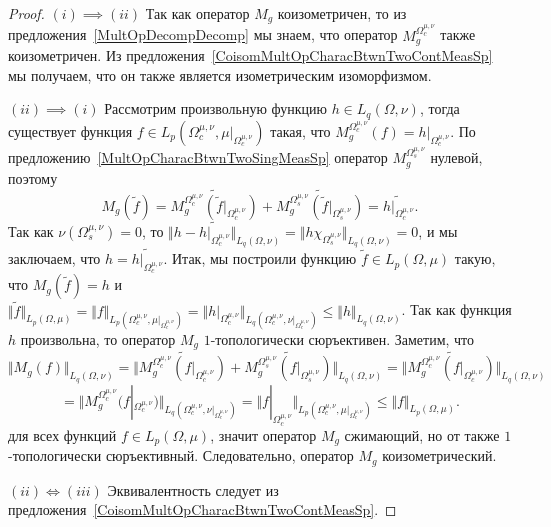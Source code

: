 \begin{proof} $(i) \implies (ii)$ Так как оператор $M_g$ коизометричен, то из
предложения~\ref{MultOpDecompDecomp} мы знаем, что оператор
$M_g^{\Omega_c^{\mu,\nu}}$ также коизометричен. Из
предложения~\ref{CoisomMultOpCharacBtwnTwoContMeasSp} мы получаем, что он также
является изометрическим изоморфизмом. 

$(ii) \implies (i)$ Рассмотрим произвольную функцию $h\in L_q(\Omega,\nu)$,
тогда существует функция $f\in
L_p(\Omega_c^{\mu,\nu},\mu|_{\Omega_c^{\mu,\nu}})$ такая, что
$M_g^{\Omega_c^{\mu,\nu}}(f)=h|_{\Omega_c^{\mu,\nu}}$. По
предложению~\ref{MultOpCharacBtwnTwoSingMeasSp} оператор
$M_g^{\Omega_s^{\mu,\nu}}$ нулевой, поэтому
$$
M_g(\widetilde{f})
=\widetilde{M_g^{\Omega_c^{\mu,\nu}}(\widetilde{f}|_{\Omega_c^{\mu,\nu}})}
+\widetilde{M_g^{\Omega_s^{\mu,\nu}}(\widetilde{f}|_{\Omega_s^{\mu,\nu}})}
=\widetilde{h|_{\Omega_c^{\mu,\nu}}}.
$$
Так как $\nu(\Omega_s^{\mu,\nu})=0$, то 
$\Vert h-\widetilde{h|_{\Omega_c^{\mu,\nu}}}\Vert_{L_q(\Omega,\nu)}
=\Vert h\chi_{\Omega_s^{\mu,\nu}}\Vert_{L_q(\Omega,\nu)}=0$, и мы заключаем, что
$h=\widetilde{h|_{\Omega_c^{\mu,\nu}}}$. Итак, мы построили функцию
$\widetilde{f}\in L_p(\Omega,\mu)$ такую, что $M_g(\widetilde{f})=h$ и 
$\Vert \widetilde{f}\Vert_{L_p(\Omega,\mu)}
=\Vert f\Vert_{L_p(\Omega_c^{\mu,\nu},\mu|_{\Omega_c^{\mu,\nu}})}
=\Vert 
    h|_{\Omega_c^{\mu,\nu}}
\Vert_{L_q(\Omega_c^{\mu,\nu},\nu|_{\Omega_c^{\mu,\nu}})}
\leq\Vert h\Vert_{L_q(\Omega,\nu)}$. Так как функция $h$ произвольна, 
то оператор $M_g$ $1$-топологически сюръективен. Заметим, что
$$
\Vert M_g(f)\Vert_{L_q(\Omega,\nu)}
=\Vert
    \widetilde{M_g^{\Omega_c^{\mu,\nu}}(f|_{\Omega_c^{\mu,\nu}})}
    +\widetilde{M_g^{\Omega_s^{\mu,\nu}}(f|_{\Omega_s^{\mu,\nu}})}
\Vert_{L_q(\Omega,\nu)}
=\Vert
    \widetilde{M_g^{\Omega_c^{\mu,\nu}}(f|_{\Omega_c^{\mu,\nu}})}
\Vert_{L_q(\Omega,\nu)}
$$
$$
=\Vert 
    M_g^{\Omega_c^{\mu,\nu}}(f|_{\Omega_c^{\mu,\nu}})
\Vert_{L_q(\Omega_c^{\mu,\nu},\nu|_{\Omega_c^{\mu,\nu}})}
=\Vert 
    f|_{\Omega_c^{\mu,\nu}}
\Vert_{L_p(\Omega_c^{\mu,\nu},\mu|_{\Omega_c^{\mu,\nu}})}
\leq\Vert f \Vert_{L_p(\Omega,\mu)}.
$$
для всех функций $f\in L_p(\Omega,\mu)$, значит оператор $M_g$ сжимающий, но от
также $1$-топологически сюръективный. Следовательно, оператор $M_g$
коизометрический.

$(ii) \Longleftrightarrow (iii)$ Эквивалентность следует из
предложения~\ref{CoisomMultOpCharacBtwnTwoContMeasSp}.
\end{proof}

